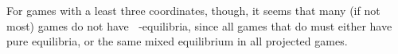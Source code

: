 \documentclass[a4paper]{scrreprt}
\DeclareMathOperator{\leqtail}{\leq_{\text{tail}}}
\begin{document}
    For games with a least three coordinates, though, it seems that many (if not most) games do not have $\leqtail$-equilibria, since all games that do must either have pure equilibria, or the same mixed equilibrium in all projected games.
    
    \printbibliography
\end{document}
